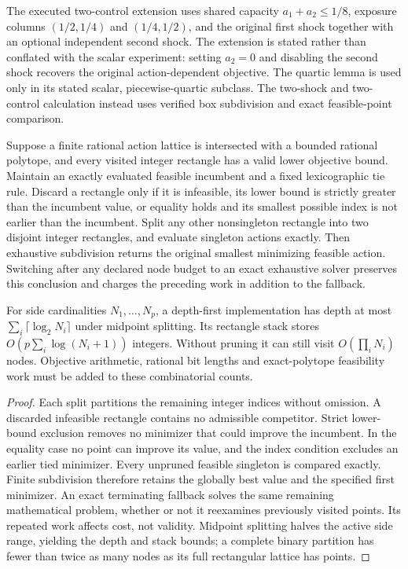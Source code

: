 The executed two-control extension uses shared capacity $a_1+a_2\le1/8$, exposure columns $(1/2,1/4)$ and $(1/4,1/2)$, and the original first shock together with an optional independent second shock. The extension is stated rather than conflated with the scalar experiment: setting $a_2=0$ and disabling the second shock recovers the original action-dependent objective. The quartic lemma is used only in its stated scalar, piecewise-quartic subclass. The two-shock and two-control calculation instead uses verified box subdivision and exact feasible-point comparison.

\begin{theorem}\label{thm:box-search60}
Suppose a finite rational action lattice is intersected with a bounded rational polytope, and every visited integer rectangle has a valid lower objective bound. Maintain an exactly evaluated feasible incumbent and a fixed lexicographic tie rule. Discard a rectangle only if it is infeasible, its lower bound is strictly greater than the incumbent value, or equality holds and its smallest possible index is not earlier than the incumbent. Split any other nonsingleton rectangle into two disjoint integer rectangles, and evaluate singleton actions exactly. Then exhaustive subdivision returns the original smallest minimizing feasible action. Switching after any declared node budget to an exact exhaustive solver preserves this conclusion and charges the preceding work in addition to the fallback.

For side cardinalities $N_1,\ldots,N_p$, a depth-first implementation has depth at most $\sum_i\lceil\log_2N_i\rceil$ under midpoint splitting. Its rectangle stack stores $O(p\sum_i\log(N_i+1))$ integers. Without pruning it can still visit $O(\prod_i N_i)$ nodes. Objective arithmetic, rational bit lengths and exact-polytope feasibility work must be added to these combinatorial counts.
\end{theorem}
\begin{proof}
Each split partitions the remaining integer indices without omission. A discarded infeasible rectangle contains no admissible competitor. Strict lower-bound exclusion removes no minimizer that could improve the incumbent. In the equality case no point can improve its value, and the index condition excludes an earlier tied minimizer. Every unpruned feasible singleton is compared exactly. Finite subdivision therefore retains the globally best value and the specified first minimizer. An exact terminating fallback solves the same remaining mathematical problem, whether or not it reexamines previously visited points. Its repeated work affects cost, not validity. Midpoint splitting halves the active side range, yielding the depth and stack bounds; a complete binary partition has fewer than twice as many nodes as its full rectangular lattice has points.
\end{proof}

